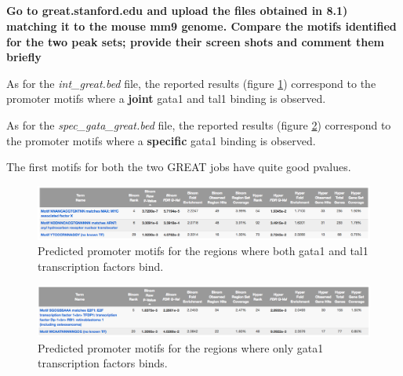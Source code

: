 \documentclass[12pt, a4paper]{article}
\begin{document}
	\subsection{}
	\textbf{Go to great.stanford.edu and upload the files obtained in 8.1) matching it to the mouse mm9 genome. Compare the motifs identified for the two peak sets; provide their screen shots and comment them briefly}
	
	As for the \textit{int\_great.bed} file, the reported results (figure \ref{fig:int_great}) correspond to the promoter motifs where a \textbf{joint} gata1 and tal1 binding is observed.
	
	As for the \textit{spec\_gata\_great.bed} file, the reported results (figure \ref{fig:spec_gata_great}) correspond to the promoter motifs where a \textbf{specific} gata1 binding is observed.
	
	The first motifs for both the two GREAT jobs have quite good pvalues.
	
	
	\clearpage
	
	\begin{figure}[h]
		\centering
		\includegraphics[width = .99\textwidth]{int_great}
		\caption{Predicted promoter motifs for the regions where both gata1 and tal1 transcription factors bind.}
		\label{fig:int_great}
	\end{figure}
	
	
	\begin{figure}[h]
		\centering
		\includegraphics[width = .99\textwidth]{spec_gata_great}
		\caption{Predicted promoter motifs for the regions where only gata1 transcription factors binds.}
		\label{fig:spec_gata_great}
	\end{figure}
	
\end{document}
